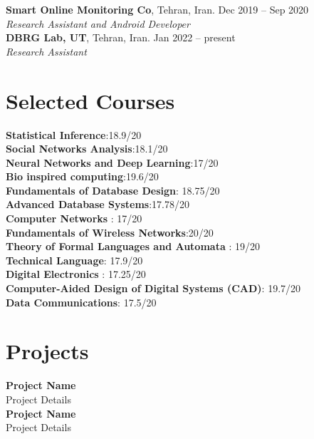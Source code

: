 \documentclass[margin,line]{res}
\begin{document}
\begin{resume}
{\bf Smart Online Monitoring Co}, Tehran, Iran. \hfill{Dec 2019 -- Sep 2020}\\
{\em Research Assistant and Android Developer  }\\

{\bf DBRG Lab, UT}, Tehran, Iran. \hfill{Jan 2022 -- present}\\
{\em Research Assistant  }\\

\section{\sc Selected Courses}
{\bf Statistical Inference}:18.9/20\\
{\bf Social Networks Analysis}:18.1/20\\
{\bf Neural Networks and Deep Learning}:17/20\\
{\bf Bio inspired computing}:19.6/20\\
{\bf Fundamentals of Database Design}: 18.75/20\\
{\bf Advanced Database Systems}:17.78/20\\
{\bf Computer Networks} :‌ 17/20\\
{\bf Fundamentals of Wireless Networks}:20/20\\
{\bf Theory of Formal Languages and Automata} :‌ 19/20\\
{\bf Technical Language}: 17.9/20\\
{\bf Digital Electronics} :‌ 17.25/20\\
{\bf Computer-Aided Design of Digital Systems (CAD)}: 19.7/20\\
{\bf Data Communications}: 17.5/20\\

\section{\sc Projects}
{\bf Project Name}\\
Project Details\\

{\bf Project Name}\\
Project Details\\




\end{resume}
\end{document}
